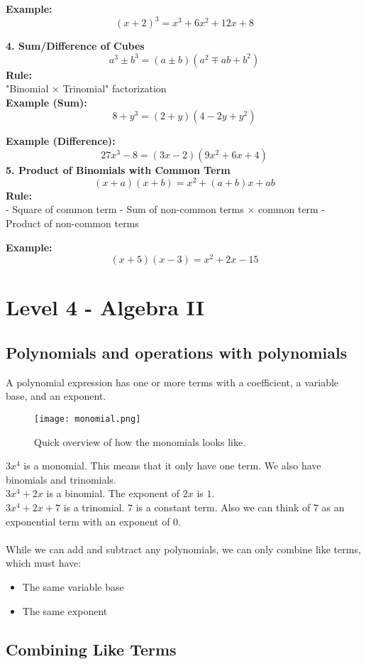 \documentclass{article} %
\begin{document}
\textbf{Example:}  
\[
(x + 2)^3 = x^3 + 6x^2 + 12x + 8
\]  

\textbf{4. Sum/Difference of Cubes}  
\[
a^3 \pm b^3 = (a \pm b)(a^2 \mp ab + b^2)
\]  
\textbf{Rule:}\\
"Binomial × Trinomial" factorization\\  
\textbf{Example (Sum):}  
\[
8 + y^3 = (2 + y)(4 - 2y + y^2)
\]  

\textbf{Example (Difference):}  
\[
27x^3 - 8 = (3x - 2)(9x^2 + 6x + 4)
\]  
\textbf{5. Product of Binomials with Common Term}  
\[
(x + a)(x + b) = x^2 + (a+b)x + ab
\]  
\textbf{Rule:}\\  
- Square of common term  
- Sum of non-common terms × common term  
- Product of non-common terms  

\textbf{Example:}  
\[
(x + 5)(x - 3) = x^2 + 2x - 15
\]

\section{Level 4 - Algebra II}
\subsection{Polynomials and operations with polynomials}
A polynomial expression has one or more terms with a coefficient, a variable base, and an exponent.
\begin{figure}[H]
    \centering
    \texttt{[image: monomial.png]}
    \caption{Quick overview of how the monomials looks like.}
    \label{fig:etiqueta}
\end{figure}
\noindent$3x^{4}$ is a monomial. This means that it only have one term. We also have binomials and trinomials.\\
$3x^{4}+2x$ is a binomial. The exponent of $2x$ is $1$.\\
$3x^{4}+2x+7$ is a trinomial. $7$ is a constant term. Also we can think of $7$ as an exponential term with an exponent of $0$.\\
\\
While we can add and subtract any polynomials, we can only combine like terms, which must have:
\begin{itemize}
    \item The same variable base
    \item The same exponent
\end{itemize}

\subsection{Combining Like Terms}
\end{document}
